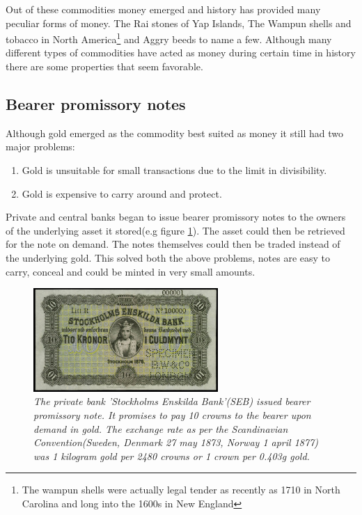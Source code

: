 Out of these commodities money emerged and history has provided many peculiar forms of money. The Rai stones of Yap Islands, The Wampun shells and tobacco in North America\footnote{The wampun shells were actually legal tender as recently as 1710 in North Carolina and long into the 1600s in New England}\cite{szabo:shelling:out} and Aggry beeds to name a few. Although many different types of commodities have acted as money during certain time in history there are some properties that seem favorable. 

\subsection{Bearer promissory notes}

Although gold emerged as the commodity best suited as money
it still had two major problems:

\begin{enumerate}
	\item Gold is unsuitable for small transactions due to the limit in divisibility.
	\item Gold is expensive to carry around and protect.
\end{enumerate}

Private and central banks began to issue bearer promissory notes to the owners of the underlying asset it stored(e.g figure \ref{fig:seb:promissory:note}). 
The asset could then be retrieved for the note on demand. The notes themselves could then be traded 
instead of the underlying gold. This solved both the above problems, notes are easy to carry, conceal and 
could be minted in very small amounts. 

\begin{figure}[!htb]
	\centering
	\includegraphics[width=7cm]{PrivateBankNoteStockholmEnskildaBank1876.JPG}
	\caption{\textit{The private bank 'Stockholms Enskilda Bank'(SEB) issued bearer
	promissory note. It promises to pay 10 crowns to the bearer upon demand in gold. 
	The exchange rate as per the Scandinavian Convention(Sweden, Denmark 27 may 1873, Norway 1 april 1877)\cite{nordic:crown}
	was 1 kilogram gold per 2480 crowns or 1 crown per 0.403g gold\cite{crown:gold}. 
 }}
	\label{fig:seb:promissory:note}
\end{figure}

